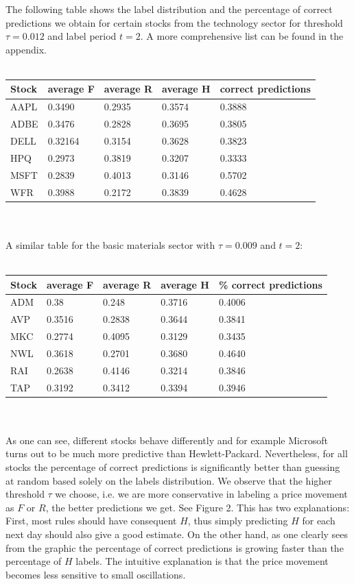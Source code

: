 \documentclass{llncs}
\begin{document}
The following table shows the label distribution and the percentage of correct predictions we obtain for certain stocks from the technology sector for threshold $\tau = 0.012$ and label period $t=2$. A more comprehensive list can be found in the appendix.
\\\\
\begin{tabular}{| l | l | l | l | l |}
\hline
Stock & average F & average R & average H & correct predictions\\
\hline
  AAPL & 0.3490 & 0.2935 & 0.3574 & 0.3888\\
\hline
  ADBE & 0.3476 & 0.2828 & 0.3695 & 0.3805 \\
\hline 
DELL & 0.32164 & 0.3154 & 0.3628 & 0.3823\\
\hline
  HPQ & 0.2973 & 0.3819 & 0.3207 & 0.3333 \\
\hline
MSFT & 0.2839 & 0.4013 & 0.3146 & 0.5702\\
\hline
WFR & 0.3988 & 0.2172 & 0.3839 & 0.4628\\
\hline
\end{tabular}
\\\\
A similar table for the basic materials sector with $\tau = 0.009$ and $t=2$:
\\\\
\begin{tabular}{| l | l | l | l | l |}
\hline
Stock & average F & average R & average H & \% correct predictions\\
\hline
ADM & 0.38 & 0.248 & 0.3716 & 0.4006\\
\hline
AVP & 0.3516 & 0.2838 & 0.3644 & 0.3841\\
\hline
MKC & 0.2774 & 0.4095 & 0.3129 & 0.3435\\
\hline
NWL & 0.3618 & 0.2701 & 0.3680 & 0.4640\\
\hline
RAI & 0.2638 & 0.4146 & 0.3214 & 0.3846\\
\hline
TAP & 0.3192 & 0.3412 & 0.3394 & 0.3946\\
\hline

\end{tabular}
\\\\
As one can see, different stocks behave differently and for example Microsoft turns out to be much more predictive than Hewlett-Packard. Nevertheless, for all stocks the percentage of correct predictions is significantly better than guessing at random based solely on the labels distribution. 
We observe that the higher threshold $\tau$ we choose, i.e. we are more conservative in labeling a price movement as $F$ or $R$, the better predictions we get. See Figure 2. This has two explanations: First, most rules should have consequent $H$, thus simply predicting $H$ for each next day should also give a good estimate. On the other hand, as one clearly sees from the graphic the percentage of correct predictions is growing faster than the percentage of $H$ labels. The intuitive explanation is that the price movement becomes less sensitive to small oscillations.
\end{document}
